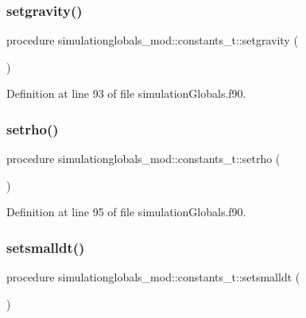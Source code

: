 \subsubsection{\texorpdfstring{setgravity()}{setgravity()}}
{\footnotesize\ttfamily procedure simulationglobals\+\_\+mod\+::constants\+\_\+t\+::setgravity (\begin{DoxyParamCaption}{ }\end{DoxyParamCaption})\hspace{0.3cm}{\ttfamily [private]}}



Definition at line 93 of file simulation\+Globals.\+f90.

\mbox{\label{structsimulationglobals__mod_1_1constants__t_a8c3a9d4776bce5b6e7ae475bd7711f0b}} 
\subsubsection{\texorpdfstring{setrho()}{setrho()}}
{\footnotesize\ttfamily procedure simulationglobals\+\_\+mod\+::constants\+\_\+t\+::setrho (\begin{DoxyParamCaption}{ }\end{DoxyParamCaption})\hspace{0.3cm}{\ttfamily [private]}}



Definition at line 95 of file simulation\+Globals.\+f90.

\mbox{\label{structsimulationglobals__mod_1_1constants__t_abae3cbfbc8ed893c747a8088da5372e6}} 
\subsubsection{\texorpdfstring{setsmalldt()}{setsmalldt()}}
{\footnotesize\ttfamily procedure simulationglobals\+\_\+mod\+::constants\+\_\+t\+::setsmalldt (\begin{DoxyParamCaption}{ }\end{DoxyParamCaption})\hspace{0.3cm}{\ttfamily [private]}}



